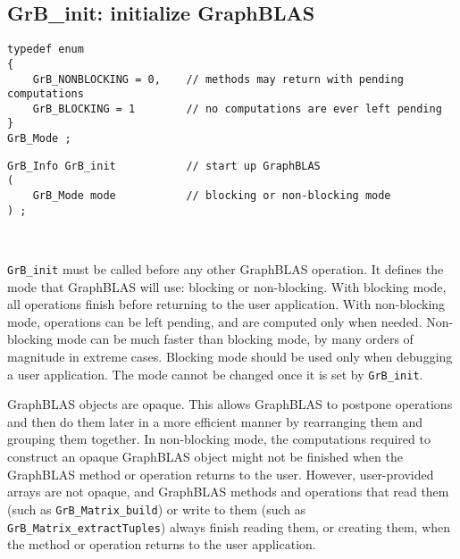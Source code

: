 \documentclass[12pt]{article}
\begin{document}
\subsection{{\sf GrB\_init:} initialize GraphBLAS} %
\label{init}

\begin{mdframed}[userdefinedwidth=6in]
{\footnotesize
\begin{verbatim}
typedef enum
{
    GrB_NONBLOCKING = 0,    // methods may return with pending computations
    GrB_BLOCKING = 1        // no computations are ever left pending
}
GrB_Mode ;
\end{verbatim}
}\end{mdframed}

\begin{mdframed}[userdefinedwidth=6in]
{\footnotesize
\begin{verbatim}
GrB_Info GrB_init           // start up GraphBLAS
(
    GrB_Mode mode           // blocking or non-blocking mode
) ;
\end{verbatim}
}\end{mdframed}

\hypertarget{link:init}{\mbox{ }}%
\verb'GrB_init' must be called before any other GraphBLAS operation.  It
defines the mode that GraphBLAS will use:  blocking or non-blocking.  With
blocking mode, all operations finish before returning to the user application.
With non-blocking mode, operations can be left pending, and are computed only
when needed.  Non-blocking mode can be much faster than blocking mode, by many
orders of magnitude in extreme cases.  Blocking mode should be used only when
debugging a user application.  The mode cannot be changed once it is set by
\verb'GrB_init'.

GraphBLAS objects are opaque.  This allows GraphBLAS to
postpone operations and then do them later in a more efficient manner by
rearranging them and grouping them together.  In non-blocking mode, the
computations required to construct an opaque GraphBLAS object might not be
finished when the GraphBLAS method or operation returns to the user.  However,
user-provided arrays are not opaque, and GraphBLAS methods and operations that
read them (such as \verb'GrB_Matrix_build') or write to them (such as
\verb'GrB_Matrix_extractTuples') always finish reading them, or creating them,
when the method or operation returns to the user application.
\end{document}
